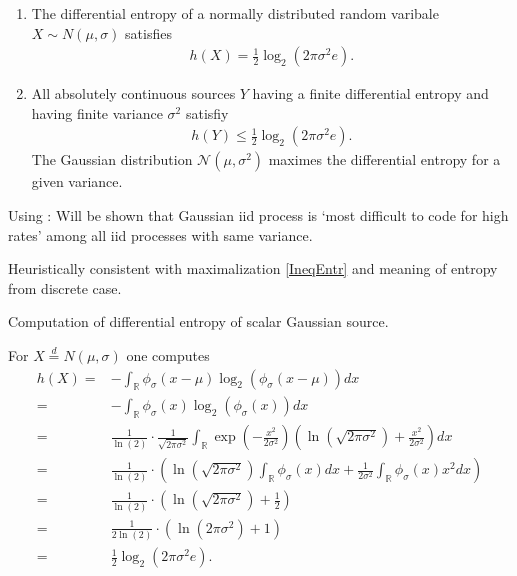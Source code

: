 \begin{frame}
\begin{proposition}
\begin{enumerate}
\item The differential entropy of a normally distributed random varibale $X\sim N(\mu,\sigma)$ satisfies
\begin{align}\label{EqDiffEntrGV}
h(X)= \frac{1}{2}\log_2(2\pi\sigma^2 e).
\end{align}
\item All absolutely continuous sources $Y$ having a finite differential entropy and having finite variance $\sigma^2$ satisfiy
\begin{align}\label{IneqEntr}
h(Y)\leq \frac{1}{2}\log_2(2\pi\sigma^2 e).
\end{align}
The Gaussian distribution $\mathcal{N}(\mu,\sigma^2)$ maximes the differential entropy for a given variance. 
\end{enumerate}
\end{proposition}
\bit
\item Using : Will be shown that Gaussian iid process is `most difficult to code for high rates' among 
all iid processes with same variance.
\item [\iarrow] Heuristically consistent with maximalization \eqref{IneqEntr} and meaning of entropy from discrete case.  
\eit

\end{frame}

\begin{frame}{Computation of differential entropy of scalar Gaussian source.}
\bit
\item For $X\stackrel{d}{=} N(\mu,\sigma)$ one computes 
\begin{align*}
h(X)=&-\int_{\mathbb{R}}\phi_{\sigma}(x-\mu)\log_2(\phi_{\sigma}(x-\mu))dx\\
=&-\int_{\mathbb{R}}\phi_{\sigma}(x)\log_2(\phi_{\sigma}(x))dx\\
=& \frac{1}{\ln(2)}\cdot\frac{1}{\sqrt{2\pi\sigma^2}}\int_{\mathbb{R}}\exp\left(-\frac{x^2}{2\sigma^2}\right)\left(\ln(\sqrt{2\pi\sigma^2})+\frac{x^2}{2\sigma^2}\right)dx\\
=&\frac{1}{\ln(2)}\cdot\left(\ln(\sqrt{2\pi\sigma^2})\int_{\mathbb{R}}\phi_\sigma(x)dx+\frac{1}{2\sigma^2}\int_{\mathbb{R}}\phi_\sigma(x)x^2dx\right)\\
=&\frac{1}{\ln(2)}\cdot\left(\ln(\sqrt{2\pi\sigma^2})+\frac{1}{2}\right)\\
=&\frac{1}{2\ln(2)}\cdot\left(\ln(2\pi\sigma^2)+1\right)\\ 
=&\frac{1}{2}\log_2(2\pi\sigma^2 e).
\end{align*}
\eit
\end{frame} 

